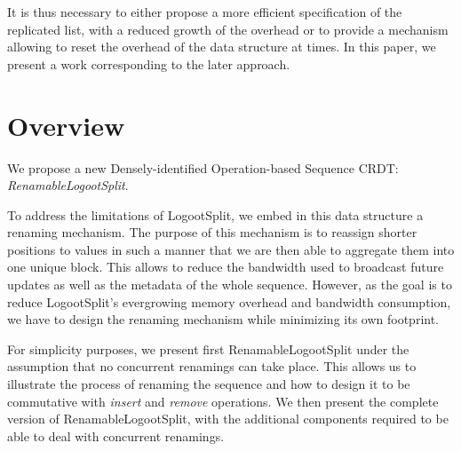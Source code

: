 \documentclass{article}
\theoremstyle{definition}
\newcounter{note-counter}
\theoremstyle{definition}
\theoremstyle{definition}
\theoremstyle{definition}
\begin{document}



It is thus necessary to either propose a more efficient specification of the replicated list, with a reduced growth of the overhead
or to provide a mechanism allowing to reset the overhead of the data structure at times.
In this paper, we present a work corresponding to the later approach.

\section{Overview}

We propose a new Densely-identified Operation-based Sequence \ac{CRDT}: \emph{RenamableLogootSplit}.

To address the limitations of LogootSplit, we embed in this data structure a renaming mechanism.
The purpose of this mechanism is to reassign shorter positions to values in such a manner that we are then able to aggregate them into one unique block.
This allows to reduce the bandwidth used to broadcast future updates as well as the metadata of the whole sequence.
However, as the goal is to reduce LogootSplit's evergrowing memory overhead and bandwidth consumption, we have to design the renaming mechanism while minimizing its own footprint.

For simplicity purposes, we present first RenamableLogootSplit under the assumption that no concurrent renamings can take place.
This allows us to illustrate the process of renaming the sequence and how to design it to be commutative with \emph{insert} and \emph{remove} operations.
We then present the complete version of RenamableLogootSplit, with the additional components required to be able to deal with concurrent renamings.
\end{document}
